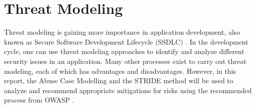 \chapter{Threat Modeling}
\label{chap:threat_modeling}
Threat modeling is gaining more importance in application development, also known as Secure Software Development Lifecycle (SSDLC) \citep{snyk_2022}. In the development cycle, one can use threat modeling approaches to identify and analyze different security issues in an application. Many other processes exist to carry out threat modeling, each of which has advantages and disadvantages. However, in this report, the Abuse Case Modelling and the STRIDE method will be used to analyze and recommend appropriate mitigations for risks using the recommended process from OWASP \citep{owasp_threat_model_process}.

